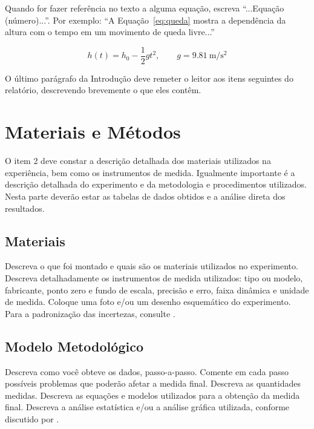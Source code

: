 \documentclass{relatorio}
\begin{document}
\vspace*{10pt}
\enlargethispage{\baselineskip}

Quando for fazer referência no texto a alguma equação, escreva ``...Equação (número)...''. Por exemplo: ``A Equação~\eqref{eq:queda} mostra a dependência da altura com o tempo em um movimento de queda livre...''

\begin{equation}\label{eq:queda}
  h(t) = h_0 - \frac{1}{2} g t^2,
  \qquad
  g = \SI{9.81}{\meter\per\second\squared}
\end{equation}

O último parágrafo da Introdução deve remeter o leitor aos itens seguintes do relatório, descrevendo brevemente o que eles contêm.

\section{Materiais e Métodos}

O item 2 deve constar a descrição detalhada dos materiais utilizados na experiência, bem como os instrumentos de medida. Igualmente importante é a descrição detalhada do experimento e da metodologia e procedimentos utilizados. Nesta parte deverão estar as tabelas de dados obtidos e a análise direta dos resultados.

\subsection{Materiais}

Descreva o que foi montado e quais são os materiais utilizados no experimento. Descreva detalhadamente os instrumentos de medida utilizados: tipo ou modelo, fabricante, ponto zero e fundo de escala, precisão e erro, faixa dinâmica e unidade de medida. Coloque uma foto e/ou um desenho esquemático do experimento. Para a padronização das incertezas, consulte \citet{unifei2014}.

\subsection{Modelo Metodológico}

Descreva como você obteve os dados, passo-a-passo. Comente em cada passo possíveis problemas que poderão afetar a medida final. Descreva as quantidades medidas. Descreva as equações e modelos utilizados para a obtenção da medida final. Descreva a análise estatística e/ou a análise gráfica utilizada, conforme discutido por \citet{giller1996}.
\end{document}
